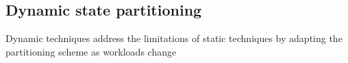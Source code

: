 \subsection{Dynamic state partitioning}

Dynamic techniques address the limitations of static techniques by adapting the
partitioning scheme as workloads change





